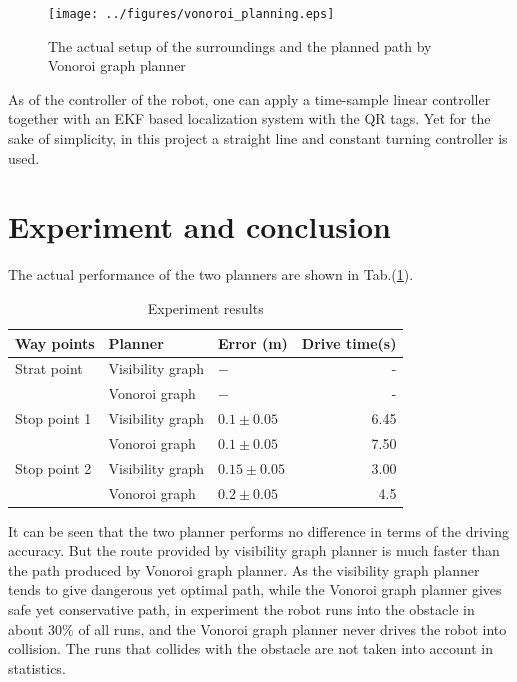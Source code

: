 \documentclass[12pt]{article}
\begin{document}
\begin{figure}[htbp]
\centering
\texttt{[image: ../figures/vonoroi\_planning.eps]}
\caption{The actual setup of the surroundings and the planned path by Vonoroi graph planner}\label{vo}
\end{figure}

As of the controller of the robot, one can apply a time-sample linear controller together with an EKF based localization system with the QR tags. Yet for the sake of simplicity, in this project a straight line and constant turning controller is used.



\section{Experiment and conclusion}
The actual performance of the two planners are shown in Tab.(\ref{tab1}). 
\begin{table}[hp]
\centering
\caption{Experiment results}
\label{tab1}
\begin{tabular}{lllr}

Way points    & Planner & Error (m) & Drive time(s)\\
\hline
Strat point      & Visibility graph    & $- $ &-   \\
          & Vonoroi graph        & $- $ &-     \\
Stop point 1       & Visibility graph     & $0.1 \pm 0.05$ &    6.45 \\
		& Vonoroi graph     &$0.1 \pm 0.05$ &     7.50\\
Stop point 2         & Visibility graph     & $0.15 \pm 0.05$    &3.00 \\
		 & Vonoroi graph      & $0.2 \pm 0.05$   &    4.5\\
\hline
\end{tabular}
\end{table}
It can be seen that the two planner performs no difference in terms of the driving accuracy. But the route provided by visibility graph planner is much faster than the path produced by Vonoroi graph planner. As the visibility graph planner tends to give dangerous yet optimal path, while the Vonoroi graph planner gives safe yet conservative path, in experiment the robot runs into the obstacle in about $30\%$ of all runs, and the Vonoroi graph planner never drives the robot into collision. The runs that collides with the obstacle are not taken into account in statistics. 
\end{document}
